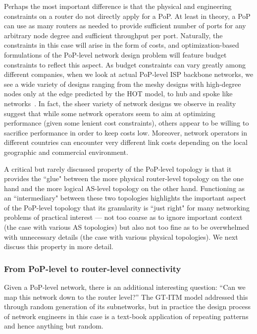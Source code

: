 Perhaps the most important difference is that the physical and engineering 
constraints on a router do not directly apply for a PoP. At least in theory, 
a PoP can use as many routers as needed to provide sufficient number of ports 
for any arbitrary node degree and sufficient throughput per port. Naturally, 
the constraints in this case will arise in the form of costs, and optimization-based 
formulations of the PoP-level network design problem will feature budget constraints 
to reflect this aspect.  As budget constraints can vary greatly among different 
companies, when we look at actual PoP-level ISP backbone networks, we see a wide 
variety of designs ranging from the meshy designs with high-degree nodes only at 
the edge predicted by the HOT model, to hub and spoke like networks~\cite{Zoo}. 
In fact, the sheer variety of network designs we observe in reality suggest that 
while some network operators seem to aim at optimizing performance (given some 
lenient cost constraints), others appear to be willing to sacrifice performance 
in order to keep costs low. Moreover, network operators in different countries 
can encounter very different link costs depending on the local geographic and 
commercial environment. 

A critical but rarely discussed property of the PoP-level topology is that it 
provides the ``glue" between the more physical router-level topology on the one 
hand and the more logical AS-level topology on the other hand. Functioning as 
an ``intermediary" between these two topologies highlights the important aspect 
of the PoP-level topology that its granularity is ``just right" for many networking 
problems of practical interest --- not too coarse as to ignore important context 
(\eg the case with various AS topologies) but also not too fine as to be 
overwhelmed with unnecessary details (\eg the case with various physical 
topologies). We next discuss this property in more detail.

\subsubsection{From PoP-level to router-level connectivity}

Given a PoP-level network, there is an additional interesting
question: ``Can we map this network down to the router level?''  The
GT-ITM model addressed this through random generation of its
subnetworks, but in practice the design process of network engineers
in this case is a text-book application of repeating
patterns~\cite{Cisco05,Gill,Morris07} and hence anything but random.

